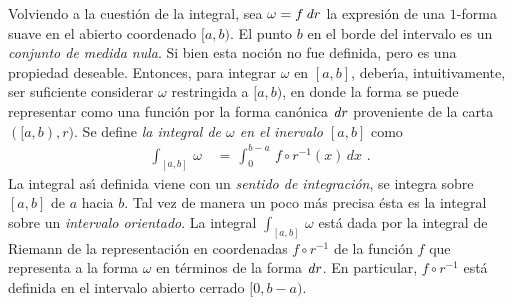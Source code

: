 Volviendo a la cuesti\'{o}n de la integral, sea $\omega=f\,\mathit{d}_{}{r}$ la
expresi\'{o}n de una $1$-forma suave en el abierto coordenado $[a,b)$.
El punto $b$ en el borde del intervalo es un \emph{conjunto de medida nula}.
Si bien esta noci\'{o}n no fue definida, pero es una propiedad deseable.
Entonces, para integrar $\omega$ en $[a,b]$, deber\'{\i}a, intuitivamente,
ser suficiente considerar $\omega$ restringida a $[a,b)$, en donde
la forma se puede representar como una funci\'{o}n por la forma
can\'{o}nica $\mathit{d}_{}{r}$ proveniente de la carta $([a,b),r)$. Se define
\emph{la integral de $\omega$ en el inervalo $[a,b]$} como
\begin{align*}
	\int_{[a,b]}\,\omega & \,=\,\int_{0}^{b-a}\,f\circ r^{-1}(x)\,dx
	\text{ .}
\end{align*}
%
La integral as\'{\i} definida viene con un \emph{sentido de integraci\'{o}n},
se integra sobre $[a,b]$ de $a$ hacia $b$. Tal vez de manera un poco m\'{a}s
precisa \'{e}sta es la integral sobre un \emph{intervalo orientado}.
La integral $\int_{[a,b]}\,\omega$ est\'{a} dada por la integral de Riemann
de la representaci\'{o}n en coordenadas $f\circ r^{-1}$ de la funci\'{o}n
$f$ que representa a la forma $\omega$ en t\'{e}rminos de la forma
$\mathit{d}_{}{r}$. En particular, $f\circ r^{-1}$ est\'{a} definida en
el intervalo abierto cerrado $[0,b-a)$.

